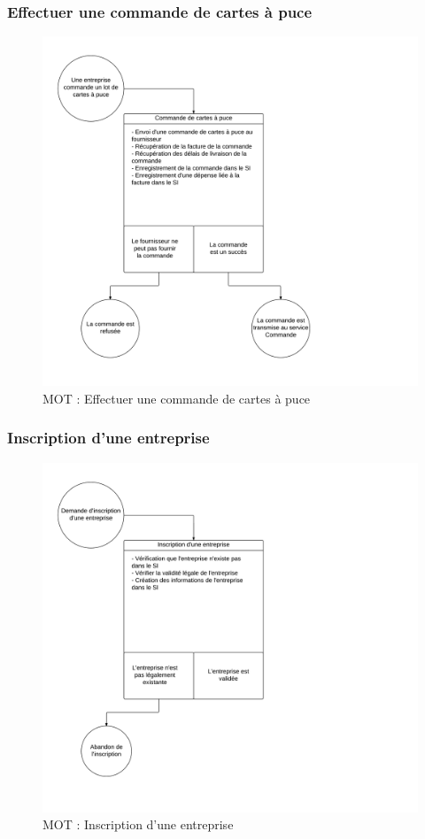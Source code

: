 \subsubsection{Effectuer une commande de cartes à puce}
\begin{figure}[ht]
    \centering
    \includegraphics[width=\textwidth]{mot-effectuer-commande-cartes-a-puce}
    \caption{MOT : Effectuer une commande de cartes à puce}
    \label{fig:mot-effectuer-commande-cartes-a-puce}
\end{figure}

\subsubsection{Inscription d'une entreprise}
\begin{figure}[ht]
    \centering
    \includegraphics[width=\textwidth]{mot-inscription-entreprise}
    \caption{MOT : Inscription d'une entreprise}
    \label{fig:mot-inscription-entreprise}
\end{figure}

